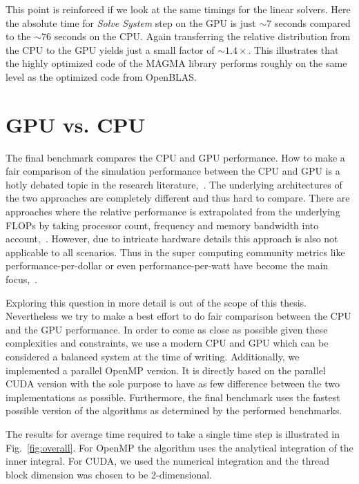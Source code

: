 This point is reinforced if we look at the same timings for the linear solvers. Here the absolute time for \emph{Solve System} step on the GPU is just ${\sim}7$ seconds compared to the ${\sim}76$ seconds on the CPU. Again transferring the relative distribution from the CPU to the GPU yields just a small factor of ${\sim}1.4×$. This illustrates that the highly optimized code of the MAGMA library performs roughly on the same level as the optimized code from OpenBLAS.

\section{GPU vs. CPU}

The final benchmark compares the CPU and GPU performance. How to make a fair comparison of the simulation performance between the CPU and GPU is a hotly debated topic in the research literature,~\cite{Lee2010}\cite{Gregg2011}. The underlying architectures of the two approaches are completely different and thus hard to compare. There are approaches where the relative performance is extrapolated from the underlying FLOPs by taking processor count, frequency and memory bandwidth into account,~\cite{Lee2010}. However, due to intricate hardware details this approach is also not applicable to all scenarios. Thus in the super computing community metrics like performance-per-dollar or even performance-per-watt have become the main focus,~\cite{Kamil2008}.

Exploring this question in more detail is out of the scope of this thesis. Nevertheless we try to make a best effort to do fair comparison between the CPU and the GPU performance. In order to come as close as possible given these complexities and constraints, we use a modern CPU and GPU which can be considered a balanced system at the time of writing. Additionally, we implemented a parallel OpenMP version. It is directly based on the parallel CUDA version with the sole purpose to have as few difference between the two implementations as possible. Furthermore, the final benchmark uses the fastest possible version of the algorithms as determined by the performed benchmarks.

The results for average time required to take a single time step is illustrated in Fig.~\ref{fig:overall}. For OpenMP the algorithm uses the analytical integration of the inner integral. For CUDA, we used the numerical integration and the thread block dimension was chosen to be 2-dimensional.

